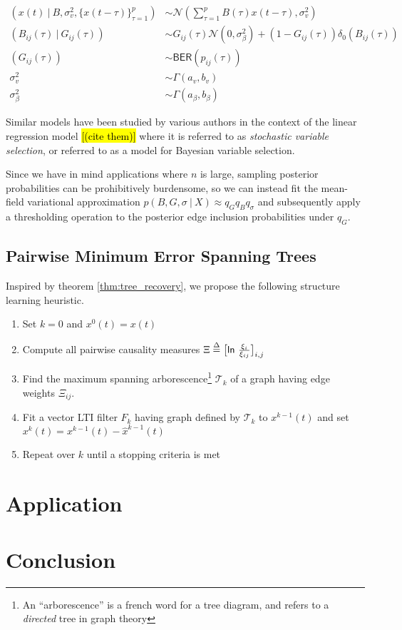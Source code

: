 \documentclass[12pt]{article}
\begin{document}
\begin{equation}
  \begin{aligned}
    (x(t)\ |\ B, \sigma_v^2, \{x(t - \tau)\}_{\tau = 1}^p) &\sim \mathcal{N}(\sum_{\tau = 1}^pB(\tau)x(t - \tau), \sigma_v^2)\\
    (B_{ij}(\tau)\ |\ G_{ij}(\tau)) &\sim G_{ij}(\tau)\mathcal{N}(0, \sigma_\beta^2) + (1 - G_{ij}(\tau))\delta_0(B_{ij}(\tau))\\
    (G_{ij}(\tau)) &\sim \mathsf{BER}(p_{ij}(\tau))\\
    \sigma_v^2 &\sim \Gamma(a_v, b_v)\\
    \sigma_\beta^2 &\sim \Gamma(a_\beta, b_\beta)
  \end{aligned}
\end{equation}

Similar models have been studied by various authors in the context of the linear regression model \hl{[(cite them)]} where it is referred to as \textit{stochastic variable selection}, or referred to as a model for Bayesian variable selection.

Since we have in mind applications where $n$ is large, sampling posterior probabilities can be prohibitively burdensome, so we can instead fit the mean-field variational approximation $p(B, G, \sigma\ |\ X) \approx q_Gq_Bq_\sigma$ and subsequently apply a thresholding operation to the posterior edge inclusion probabilities under $q_G$.

\subsection{Pairwise Minimum Error Spanning Trees}
Inspired by theorem \ref{thm:tree_recovery}, we propose the following
structure learning heuristic.


\begin{enumerate}
  \item{Set $k = 0$ and $x^0(t) = x(t)$}
  \item{Compute all pairwise causality measures $\Xi \overset{\Delta}{=} \big[\mathsf{ln\ } \frac{\xi_i}{\xi_{ij}} \big]_{i, j}$}
  \item{Find the maximum spanning arborescence\footnote{An ``arborescence'' is a french word for a tree diagram, and refers to a \textit{directed} tree in graph theory} $\mathcal{T}_k$ of a graph having edge weights $\Xi_{ij}$.}
  \item{Fit a vector LTI filter $F_k$ having graph defined by $\mathcal{T}_k$ to $x^{k - 1}(t)$ and set $x^k(t) = x^{k - 1}(t) - \hat{x}^{k - 1}(t)$}
  \item{Repeat over $k$ until a stopping criteria is met}
\end{enumerate}


\section{Application}
\section{Conclusion}

\printbibliography
\end{document}
